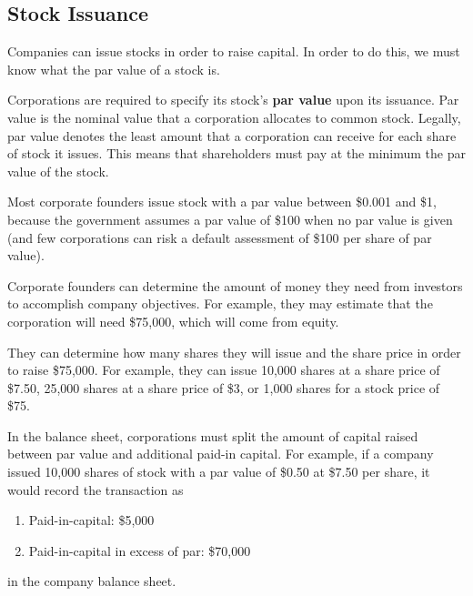 \documentclass{article}
\begin{document}
  \subsection{Stock Issuance}

    Companies can issue stocks in order to raise capital. In order to do this, we must know what the par value of a stock is. 

    \begin{definition}
      Corporations are required to specify its stock's \textbf{par value} upon its issuance. Par value is the nominal value that a corporation allocates to common stock. Legally, par value denotes the least amount that a corporation can receive for each share of stock it issues. This means that shareholders must pay at the minimum the par value of the stock. 

      Most corporate founders issue stock with a par value between \$0.001 and \$1, because the government assumes a par value of \$100 when no par value is given (and few corporations can risk a default assessment of \$100 per share of par value). 
    \end{definition}

    \begin{definition}
      Corporate founders can determine the amount of money they need from investors to accomplish company objectives. For example, they may estimate that the corporation will need \$75,000, which will come from equity. 

      They can determine how many shares they will issue and the share price in order to raise \$75,000. For example, they can issue 10,000 shares at a share price of \$7.50, 25,000 shares at a share price of \$3, or 1,000 shares for a stock price of \$75. 
    \end{definition}

    \begin{definition}
      In the balance sheet, corporations must split the amount of capital raised between par value and additional paid-in capital. For example, if a company issued 10,000 shares of stock with a par value of \$0.50 at \$7.50 per share, it would record the transaction as 
      \begin{enumerate}
        \item Paid-in-capital: \$5,000
        \item Paid-in-capital in excess of par: \$70,000
      \end{enumerate}
      in the company balance sheet. 
    \end{definition}
\end{document}
